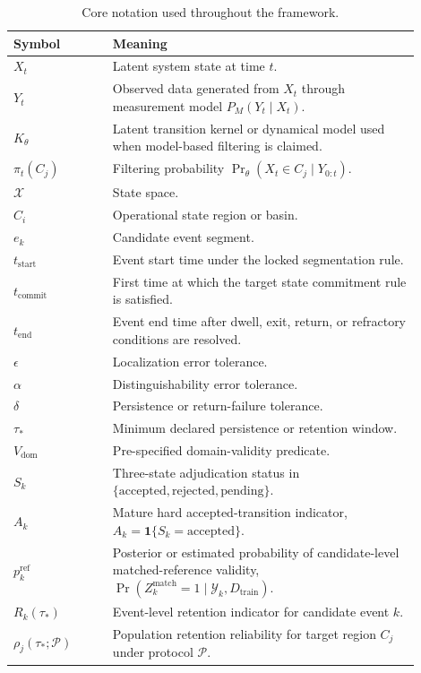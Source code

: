 \documentclass[11pt,a4paper]{article}
\newcommand{\1}{\mathbf{1}}
\begin{document}
\begin{table}[h]
\centering
\caption{Core notation used throughout the framework.}
\label{tab:notation}
\begin{tabular}{p{0.22\linewidth}p{0.68\linewidth}}
\toprule
Symbol & Meaning \\
\midrule
$X_t$ & Latent system state at time $t$. \\
$Y_t$ & Observed data generated from $X_t$ through measurement model $P_M(Y_t\mid X_t)$. \\
$K_\theta$ & Latent transition kernel or dynamical model used when model-based filtering is claimed. \\
$\pi_t(C_j)$ & Filtering probability $\Pr_\theta(X_t\in C_j\mid Y_{0:t})$. \\
$\mathcal{X}$ & State space. \\
$C_i$ & Operational state region or basin. \\
$e_k$ & Candidate event segment. \\
$t_{\mathrm{start}}$ & Event start time under the locked segmentation rule. \\
$t_{\mathrm{commit}}$ & First time at which the target state commitment rule is satisfied. \\
$t_{\mathrm{end}}$ & Event end time after dwell, exit, return, or refractory conditions are resolved. \\
$\epsilon$ & Localization error tolerance. \\
$\alpha$ & Distinguishability error tolerance. \\
$\delta$ & Persistence or return-failure tolerance. \\
$\tau_\ast$ & Minimum declared persistence or retention window. \\
$V_{\mathrm{dom}}$ & Pre-specified domain-validity predicate. \\
$S_k$ & Three-state adjudication status in $\{\mathrm{accepted},\mathrm{rejected},\mathrm{pending}\}$. \\
$A_k$ & Mature hard accepted-transition indicator, $A_k=\1\{S_k=\mathrm{accepted}\}$. \\
$p_k^{\mathrm{ref}}$ & Posterior or estimated probability of candidate-level matched-reference validity, $\Pr(Z^{\mathrm{match}}_k=1\mid\mathcal{Y}_k,D_{\mathrm{train}})$. \\
$R_k(\tau_\ast)$ & Event-level retention indicator for candidate event $k$. \\
$\rho_j(\tau_\ast;\mathcal{P})$ & Population retention reliability for target region $C_j$ under protocol $\mathcal{P}$. \\

\end{tabular}
\end{table}
\end{document}
